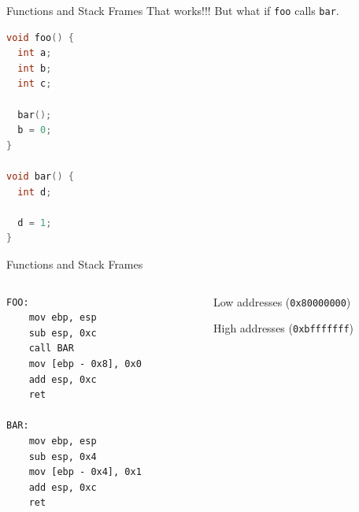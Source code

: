\documentclass[]{beamer}
\begin{document}
\begin{frame}[fragile]{Functions and Stack Frames}
    That works!!! But what if \texttt{foo} calls \texttt{bar}.
    \begin{lstlisting}[language={C}]
void foo() {
  int a;
  int b;
  int c;

  bar();
  b = 0;
}

void bar() {
  int d;

  d = 1;
}
    \end{lstlisting}    
\end{frame}

\begin{frame}[fragile]{Functions and Stack Frames}
  \begin{columns}
    \begin{column}{0.45\linewidth}
      \begin{lstlisting}[language={[x86masm]Assembler}, escapechar=\%]
FOO:
    mov ebp, esp 
    sub esp, 0xc
    call BAR
    mov [ebp - 0x8], 0x0 
    add esp, 0xc 
    ret

BAR:
    mov ebp, esp
    sub esp, 0x4
    mov [ebp - 0x4], 0x1
    add esp, 0xc
    ret
      \end{lstlisting}
    \end{column}
    \begin{column}{0.4\linewidth}
      \par
      {\scriptsize Low addresses ({\tt 0x80000000})}\\[.5em]
      {\scriptsize High addresses ({\tt 0xbfffffff})}
    \end{column}
  \end{columns}
\end{frame}
\end{document}
